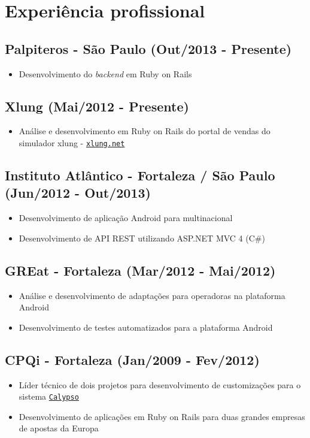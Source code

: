\documentclass[11pt]{article}
\begin{document}
\section*{Experiência profissional}
{\addtolength{\leftskip}{3.5mm}\subsection*{Palpiteros - São Paulo (Out/2013 - Presente)}
\begin{itemize}
\item Desenvolvimento do \textit{backend} em Ruby on Rails 
\end{itemize}

\subsection*{Xlung (Mai/2012 - Presente)}
\begin{itemize}
\item Análise e desenvolvimento em Ruby on Rails do portal de vendas do simulador xlung - \href{http://xlung.net}{\tt xlung.net}
\end{itemize}

\subsection*{Instituto Atlântico - Fortaleza / São Paulo (Jun/2012 - Out/2013)}
\begin{itemize}
\item Desenvolvimento de aplicação Android para multinacional
\item Desenvolvimento de API REST utilizando ASP.NET MVC 4 (C\#)
\end{itemize}

\subsection*{GREat - Fortaleza (Mar/2012 - Mai/2012)}
\begin{itemize}
\item Análise e desenvolvimento de adaptações para operadoras na plataforma Android
\item Desenvolvimento de testes automatizados para a plataforma Android
\end{itemize}

\subsection*{CPQi - Fortaleza (Jan/2009 - Fev/2012)}
\begin{itemize}
\item Líder técnico de dois projetos para desenvolvimento de customizações para o sistema \href{http://calypso.com}{\tt{Calypso}}
\item Desenvolvimento de aplicações em Ruby on Rails para duas grandes empresas de apostas da Europa 
\end{itemize}

}
\end{document}
